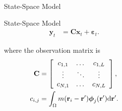 \documentclass[final]{beamer}
\newlength{\sepwid}
\newlength{\onecolwid}
\begin{document}
\begin{frame}[t]
\begin{columns}[t]
\begin{column}{\onecolwid}
\begin{block}{State-Space Model}
{\begin{alertblock}{State-Space Model \\}
\begin{align}
		\mathbf{y}_t &= \mathbf{C}\mathbf{x}_t + \boldsymbol{\varepsilon}_t.
		\end{align} 	
	\end{alertblock}
	where the observation matrix is 
	\begin{align}
		\mathbf{C} &= \left[
		\begin{array}{{ccc}} 
			c_{1,1} & \dots & c_{1,L} \\
			\vdots & \ddots & \vdots \\
			c_{N,1} & \dots & c_{N,L} 
		\end{array}
		\right], \\	
		c_{i,j} &= \int_{\Omega}m(\mathbf{r}_i - \mathbf{r}')\boldsymbol{\phi}_j(\mathbf{r}')\textrm{d}\mathbf{r}'. 
		\end{align}
	}
\end{block}

    \end{column}



  \begin{column}{\sepwid}\end{column}			%
	\begin{column}{\onecolwid}


\end{column}
\end{columns}
\end{frame}
\end{document}
